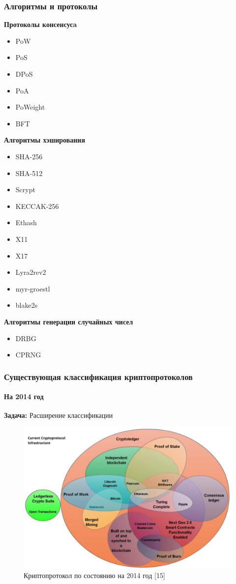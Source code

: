 \documentclass{beamer}
\begin{document}
\begin{frame}
    \frametitle{Алгоритмы и протоколы}
    \begin{multicols}{3}
        \textbf{Протоколы консенсусa}
        \begin{itemize}
            \item PoW
            \item PoS
            \item DPoS
            \item PoA
            \item PoWeight
            \item BFT
        \end{itemize}
        \columnbreak
        \textbf{Алгоритмы хэширования}
         \begin{itemize}
             \item SHA-256
             \item SHA-512
             \item Scrypt
             \item KECCAK-256
             \item Ethash
             \item X11
             \item X17
             \item Lyra2rev2
             \item myr-groestl
             \item blake2s
         \end{itemize}
        \columnbreak
        \textbf{Алгоритмы генерации случайных чисел}
        \begin{itemize}
            \item DRBG
            \item CPRNG
        \end{itemize}
    \end{multicols}
\end{frame}

\begin{frame}
    \frametitle{Существующая классификация криптопротоколов}
    \framesubtitle{На 2014 год}
    \textbf{Задача: } Расширение классификации

    \begin{figure}
        \includegraphics[width=0.75\columnwidth]{current_protocols.png}
        \caption{Криптопротокол по состоянию на 2014 год [15]}
    \end{figure}
\end{frame}
\end{document}
